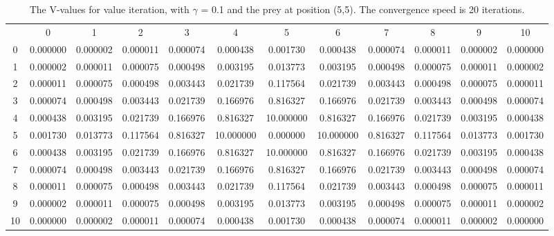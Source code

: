 \documentclass{article}
\begin{document}
\newpage
\begin{landscape}

\begin{table}[tbp]
\label{tab:valueiterationone}
\centering
\begin{tabular} {c c c c c c c c c c c c}
 & 0 & 1 & 2 & 3 & 4 & 5 & 6 & 7 & 8 & 9 & 10 \\
0 & 0.000000 & 0.000002 & 0.000011 & 0.000074 & 0.000438 & 0.001730 & 0.000438 & 0.000074 & 0.000011 & 0.000002 & 0.000000\\
1 & 0.000002 & 0.000011 & 0.000075 & 0.000498 & 0.003195 & 0.013773 & 0.003195 & 0.000498 & 0.000075 & 0.000011 & 0.000002\\
2& 0.000011 & 0.000075 & 0.000498 & 0.003443 & 0.021739 & 0.117564 & 0.021739 & 0.003443 & 0.000498 & 0.000075 & 0.000011\\
3 & 0.000074 & 0.000498 & 0.003443 & 0.021739 & 0.166976 & 0.816327 & 0.166976 & 0.021739 & 0.003443 & 0.000498 & 0.000074\\
4 & 0.000438 & 0.003195 & 0.021739 & 0.166976 & 0.816327 & 10.000000 & 0.816327 & 0.166976 & 0.021739 & 0.003195 & 0.000438\\
5 & 0.001730 & 0.013773 & 0.117564 & 0.816327 & 10.000000 & 0.000000 & 10.000000 & 0.816327 & 0.117564 & 0.013773 & 0.001730\\
6 & 0.000438 & 0.003195 & 0.021739 & 0.166976 & 0.816327 & 10.000000 & 0.816327 & 0.166976 & 0.021739 & 0.003195 & 0.000438\\
7 & 0.000074 & 0.000498 & 0.003443 & 0.021739 & 0.166976 & 0.816327 & 0.166976 & 0.021739 & 0.003443 & 0.000498 & 0.000074\\
8 & 0.000011 & 0.000075 & 0.000498 & 0.003443 & 0.021739 & 0.117564 & 0.021739 & 0.003443 & 0.000498 & 0.000075 & 0.000011\\
9 & 0.000002 & 0.000011 & 0.000075 & 0.000498 & 0.003195 & 0.013773 & 0.003195 & 0.000498 & 0.000075 & 0.000011 & 0.000002\\
10 & 0.000000 & 0.000002 & 0.000011 & 0.000074 & 0.000438 & 0.001730 & 0.000438 & 0.000074 & 0.000011 & 0.000002 & 0.000000\\
\end{tabular}\\
\caption{The V-values for value iteration, with $\gamma$ = 0.1 and the prey at position (5,5). The convergence speed is 20 iterations.}

\end{table}


\end{landscape}
\end{document}

